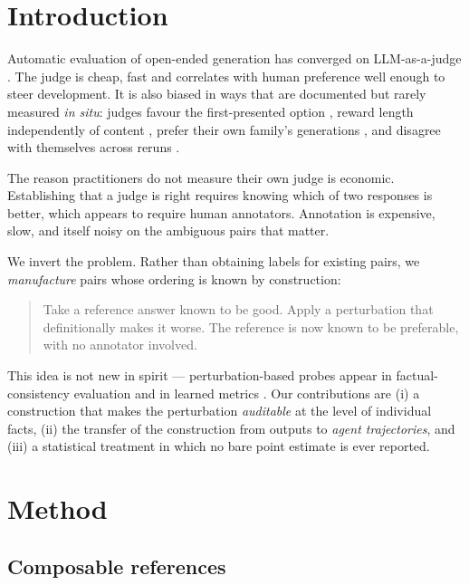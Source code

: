 \documentclass[10pt,letterpaper]{article}
\begin{document}
\section{Introduction}

Automatic evaluation of open-ended generation has converged on LLM-as-a-judge
\cite{zheng2023judging,liu2023geval}. The judge is cheap, fast and correlates with human
preference well enough to steer development. It is also biased in ways that are documented but
rarely measured \emph{in situ}: judges favour the first-presented option
\cite{wang2024large}, reward length independently of content \cite{zeng2024evaluating}, prefer
their own family's generations \cite{panickssery2024selfpreference}, and disagree with themselves
across reruns \cite{stureborg2024large}.

The reason practitioners do not measure their own judge is economic. Establishing that a judge is
right requires knowing which of two responses is better, which appears to require human
annotators. Annotation is expensive, slow, and itself noisy on the ambiguous pairs that matter.

We invert the problem. Rather than obtaining labels for existing pairs, we \emph{manufacture}
pairs whose ordering is known by construction:

\begin{quote}
Take a reference answer known to be good. Apply a perturbation that definitionally makes it
worse. The reference is now known to be preferable, with no annotator involved.
\end{quote}

This idea is not new in spirit --- perturbation-based probes appear in factual-consistency
evaluation \cite{kryscinski2020evaluating} and in learned metrics \cite{sellam2020bleurt}. Our
contributions are (i) a construction that makes the perturbation \emph{auditable} at the level of
individual facts, (ii) the transfer of the construction from outputs to \emph{agent
trajectories}, and (iii) a statistical treatment in which no bare point estimate is ever reported.

\section{Method}

\subsection{Composable references}
\end{document}

